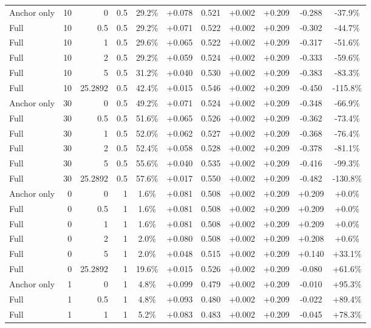 \begin{table}[htbp]
\begin{tabular}{lrrrccccccc}
Anchor only & 10 & 0 & 0.5 & 29.2\% & +0.078 & 0.521 & +0.002 & +0.209 & -0.288 & -37.9\% \\
Full & 10 & 0.5 & 0.5 & 29.2\% & +0.071 & 0.522 & +0.002 & +0.209 & -0.302 & -44.7\% \\
Full & 10 & 1 & 0.5 & 29.6\% & +0.065 & 0.522 & +0.002 & +0.209 & -0.317 & -51.6\% \\
Full & 10 & 2 & 0.5 & 29.2\% & +0.059 & 0.524 & +0.002 & +0.209 & -0.333 & -59.6\% \\
Full & 10 & 5 & 0.5 & 31.2\% & +0.040 & 0.530 & +0.002 & +0.209 & -0.383 & -83.3\% \\
Full & 10 & 25.2892 & 0.5 & 42.4\% & +0.015 & 0.546 & +0.002 & +0.209 & -0.450 & -115.8\% \\
Anchor only & 30 & 0 & 0.5 & 49.2\% & +0.071 & 0.524 & +0.002 & +0.209 & -0.348 & -66.9\% \\
Full & 30 & 0.5 & 0.5 & 51.6\% & +0.065 & 0.526 & +0.002 & +0.209 & -0.362 & -73.4\% \\
Full & 30 & 1 & 0.5 & 52.0\% & +0.062 & 0.527 & +0.002 & +0.209 & -0.368 & -76.4\% \\
Full & 30 & 2 & 0.5 & 52.4\% & +0.058 & 0.528 & +0.002 & +0.209 & -0.378 & -81.1\% \\
Full & 30 & 5 & 0.5 & 55.6\% & +0.040 & 0.535 & +0.002 & +0.209 & -0.416 & -99.3\% \\
Full & 30 & 25.2892 & 0.5 & 57.6\% & +0.017 & 0.550 & +0.002 & +0.209 & -0.482 & -130.8\% \\
Anchor only & 0 & 0 & 1 & 1.6\% & +0.081 & 0.508 & +0.002 & +0.209 & +0.209 & +0.0\% \\
Full & 0 & 0.5 & 1 & 1.6\% & +0.081 & 0.508 & +0.002 & +0.209 & +0.209 & +0.0\% \\
Full & 0 & 1 & 1 & 1.6\% & +0.081 & 0.508 & +0.002 & +0.209 & +0.209 & +0.0\% \\
Full & 0 & 2 & 1 & 2.0\% & +0.080 & 0.508 & +0.002 & +0.209 & +0.208 & +0.6\% \\
Full & 0 & 5 & 1 & 2.0\% & +0.048 & 0.515 & +0.002 & +0.209 & +0.140 & +33.1\% \\
Full & 0 & 25.2892 & 1 & 19.6\% & +0.015 & 0.526 & +0.002 & +0.209 & -0.080 & +61.6\% \\
Anchor only & 1 & 0 & 1 & 4.8\% & +0.099 & 0.479 & +0.002 & +0.209 & -0.010 & +95.3\% \\
Full & 1 & 0.5 & 1 & 4.8\% & +0.093 & 0.480 & +0.002 & +0.209 & -0.022 & +89.4\% \\
Full & 1 & 1 & 1 & 5.2\% & +0.083 & 0.483 & +0.002 & +0.209 & -0.045 & +78.3\% \\

\end{tabular}
\end{table}
